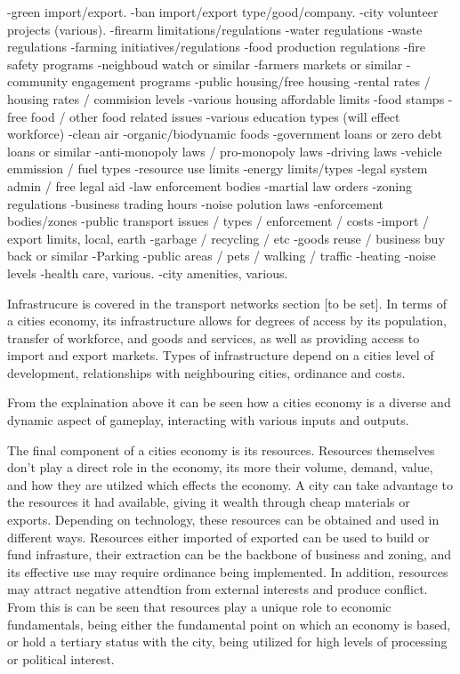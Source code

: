 -green import/export.
-ban import/export type/good/company.
-city volunteer projects (various).
-firearm limitations/regulations
-water regulations
-waste regulations
-farming initiatives/regulations
-food production regulations
-fire safety programs
-neighboud watch or similar
-farmers markets or similar
-community engagement programs
-public housing/free housing
-rental rates / housing rates / commision levels
-various housing affordable limits
-food stamps
-free food / other food related issues
-various education types (will effect workforce)
-clean air
-organic/biodynamic foods
-government loans or zero debt loans or similar
-anti-monopoly laws / pro-monopoly laws
-driving laws
-vehicle emmission / fuel types 
-resource use limits
-energy limits/types
-legal system admin / free legal aid
-law enforcement bodies
-martial law orders
-zoning regulations
-business trading hours
-noise polution laws
-enforcement bodies/zones
-public transport issues / types / enforcement / costs
-import / export limits, local, earth
-garbage / recycling / etc
-goods reuse / business buy back or similar
-Parking
-public areas / pets / walking / traffic
-heating
-noise levels
-health care, various.
-city amenities, various.


Infrastrucure is covered in the transport networks section [to be set]. In terms of a cities economy, its infrastructure allows for degrees of access by its population, transfer of workforce, and goods and services, as well as providing access to import and export markets. Types of infrastructure depend on a cities level of development, relationships with neighbouring cities, ordinance and costs. 


From the explaination above it can be seen how a cities economy is a diverse and dynamic aspect of gameplay, interacting with various inputs and outputs. 





The final component of a cities economy is its resources. Resources themselves don't play a direct role in the economy, its more their volume, demand, value, and how they are utilzed which effects the economy. A city can take advantage to the resources it had available, giving it wealth through cheap materials or exports. Depending on technology, these resources can be obtained and used in different ways. Resources either imported of exported can be used to build or fund infrasture, their extraction can be the backbone of business and zoning, and its effective use may require ordinance being implemented. In addition, resources may attract negative attendtion from external interests and produce conflict. From this is can be seen that resources play a unique role to economic fundamentals, being either the fundamental point on which an economy is based, or hold a tertiary status with the city, being utilized for high levels of processing or political interest.




